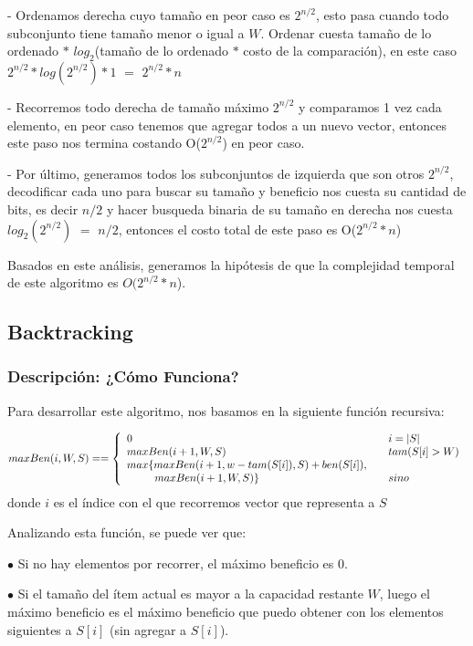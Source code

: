 \documentclass[a4paper]{article}
\begin{document}
- Ordenamos derecha cuyo tamaño en peor caso es $2^{n/2}$, esto pasa cuando todo subconjunto tiene tamaño menor o igual a $W$. Ordenar cuesta tamaño de lo ordenado $*$ $log_2$(tamaño de lo ordenado $*$ costo de la comparación), en este caso $2^{n/2} * log(2^{n/2}) * 1$ $=$ $2^{n/2} * n$

- Recorremos todo derecha de tamaño máximo $2^{n/2}$ y comparamos 1 vez cada elemento, en peor caso tenemos que agregar todos a un nuevo vector, entonces este paso nos termina costando O($2^{n/2}$) en peor caso.

- Por último, generamos todos los subconjuntos de izquierda que son otros $2^{n/2}$, decodificar cada uno para buscar su tamaño y beneficio nos cuesta su cantidad de bits, es decir $n/2$ y hacer busqueda binaria de su tamaño en derecha nos cuesta $log_2(2^{n/2})$ $=$ $n/2$, entonces el costo total de este paso es O($2^{n/2}*n$)

Basados en este análisis, generamos la hipótesis de que la complejidad temporal de este algoritmo es $O(2^{n/2}*n$).


\subsection{Backtracking}

\subsubsection{Descripción: ¿Cómo Funciona?}

Para desarrollar este algoritmo, nos basamos en la siguiente función recursiva:


$$
maxBen(i, W, S) =  = \left\{
        \begin{array}{ll}
            0 & \quad i = |S| \\
            maxBen(i+1, W, S) & \quad tam(S[i] > W) \\
            max\{maxBen(i+1, w-tam(S[i]), S) + ben(S[i]), \\
            \hspace{0.9cm} maxBen(i+1, W, S)\}   & \quad si no
        \end{array}
    \right.
$$
donde $i$ es el índice con el que recorremos vector que representa a $S$

Analizando esta función, se puede ver que:

$\bullet$ Si no hay elementos por recorrer, el máximo beneficio es 0.

$\bullet$ Si el tamaño del ítem actual es mayor a la capacidad restante $W$, luego el máximo beneficio es el máximo beneficio que puedo obtener con los elementos siguientes a $S[i]$ (sin agregar a $S[i]$).
\end{document}

